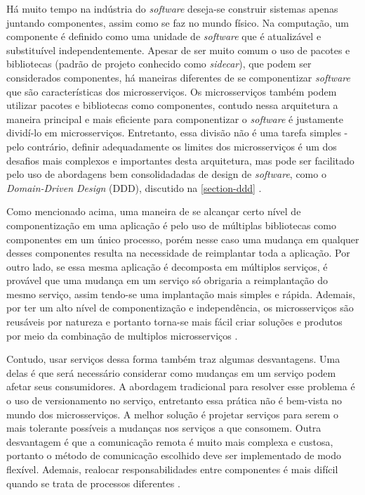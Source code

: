 Há muito tempo na indústria do \emph{software} deseja-se construir sistemas apenas juntando componentes, assim como se faz no mundo físico. Na computação, um componente é definido como uma unidade de \emph{software} que é atualizável e substituível independentemente. Apesar de ser muito comum o uso de pacotes e bibliotecas (padrão de projeto conhecido como \emph{sidecar}), que podem ser considerados componentes, há maneiras diferentes de se componentizar \emph{software} que são características dos microsserviços. Os microsserviços também podem utilizar pacotes e bibliotecas como componentes, contudo nessa arquitetura a maneira principal e mais eficiente para componentizar o \emph{software} é justamente dividí-lo em microsserviços. Entretanto, essa divisão não é uma tarefa simples - pelo contrário, definir adequadamente os limites dos microsserviços é um dos desafios mais complexos e importantes desta arquitetura, mas pode ser facilitado pelo uso de abordagens bem consolidadadas de design de \emph{software}, como o \emph{Domain-Driven Design} (DDD), discutido na \autoref{section-ddd} \cite{martin-fowler-microservices}.

Como mencionado acima, uma maneira de se alcançar certo nível de componentização em uma aplicação é pelo uso de múltiplas bibliotecas como componentes em um único processo, porém nesse caso uma mudança em qualquer desses componentes resulta na necessidade de reimplantar toda a aplicação. Por outro lado, se essa mesma aplicação é decomposta em múltiplos serviços, é provável que uma mudança em um serviço só obrigaria a reimplantação do mesmo serviço, assim tendo-se uma implantação mais simples e rápida. Ademais, por ter um alto nível de componentização e independência, os microsserviços são reusáveis por natureza e portanto torna-se mais fácil criar soluções e produtos por meio da combinação de multiplos microsserviços \cite{martin-fowler-microservices,Familiar2015}.

Contudo, usar serviços dessa forma também traz algumas desvantagens. Uma delas é que será necessário considerar como mudanças em um serviço podem afetar seus consumidores. A abordagem tradicional para resolver esse problema é o uso de versionamento no serviço, entretanto essa prática não é bem-vista no mundo dos microsserviços. A melhor solução é projetar serviços para serem o mais tolerante possíveis a mudanças nos serviços a que consomem. Outra desvantagem é que a comunicação remota é muito mais complexa e custosa, portanto o método de comunicação escolhido deve ser implementado de modo flexível. Ademais, realocar responsabilidades entre componentes é mais difícil quando se trata de processos diferentes \cite{martin-fowler-microservices}.

